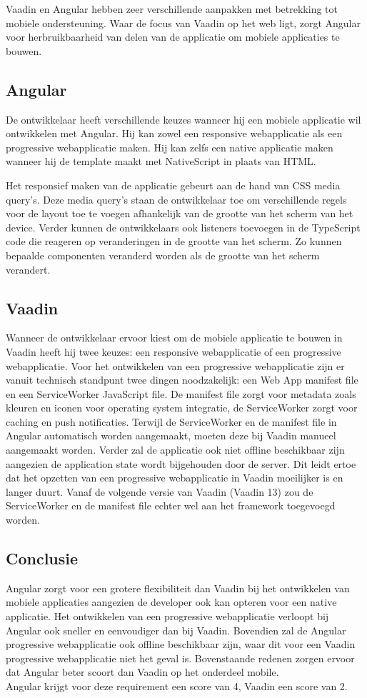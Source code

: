 Vaadin en Angular hebben zeer verschillende aanpakken met betrekking tot mobiele ondersteuning. Waar de focus van Vaadin op het web ligt, zorgt Angular voor herbruikbaarheid van delen van de applicatie om mobiele applicaties te bouwen.
\subsection{Angular}
De ontwikkelaar heeft verschillende keuzes wanneer hij een mobiele applicatie wil ontwikkelen met Angular. Hij kan zowel een responsive webapplicatie als een progressive webapplicatie maken. Hij kan zelfs een native applicatie maken wanneer hij de template maakt met NativeScript in plaats van HTML. 

Het responsief maken van de applicatie gebeurt aan de hand van CSS media query's. Deze media query's staan de ontwikkelaar toe om verschillende regels voor de layout toe te voegen afhankelijk van de grootte van het scherm van het device. Verder kunnen de ontwikkelaars ook listeners toevoegen in de TypeScript code die reageren op veranderingen in de grootte van het scherm. Zo kunnen bepaalde componenten veranderd worden als de grootte van het scherm verandert. 

\subsection{Vaadin}
Wanneer de ontwikkelaar ervoor kiest om de mobiele applicatie te bouwen in Vaadin heeft hij twee keuzes: een responsive webapplicatie of een progressive webapplicatie. 
Voor het ontwikkelen van een progressive webapplicatie zijn er vanuit technisch standpunt twee dingen noodzakelijk: een  Web App manifest file en een ServiceWorker JavaScript file. De manifest file zorgt voor metadata zoals kleuren en iconen voor operating system integratie, de ServiceWorker zorgt voor caching en push notificaties.
Terwijl de ServiceWorker en de manifest file in Angular automatisch worden aangemaakt, moeten deze bij Vaadin manueel aangemaakt worden. Verder zal de applicatie ook niet offline beschikbaar zijn aangezien de application state wordt bijgehouden door de server.
Dit leidt ertoe dat het opzetten van een progressive webapplicatie in Vaadin moeilijker is en langer duurt.  
Vanaf de volgende versie van Vaadin (Vaadin 13) zou de ServiceWorker en de manifest file echter wel aan het framework toegevoegd worden. 
\subsection{Conclusie}
Angular zorgt voor een grotere flexibiliteit dan Vaadin bij het ontwikkelen van mobiele applicaties aangezien de developer ook kan opteren voor een native applicatie. Het ontwikkelen van een progressive webapplicatie verloopt bij Angular ook sneller en eenvoudiger dan bij Vaadin. Bovendien zal de Angular progressive webapplicatie ook offline beschikbaar zijn, waar dit voor een Vaadin progressive webapplicatie niet het geval is. Bovenstaande redenen zorgen ervoor dat Angular beter scoort dan Vaadin op het onderdeel mobile. \\
Angular krijgt voor deze requirement een score van 4, Vaadin een score van 2.


